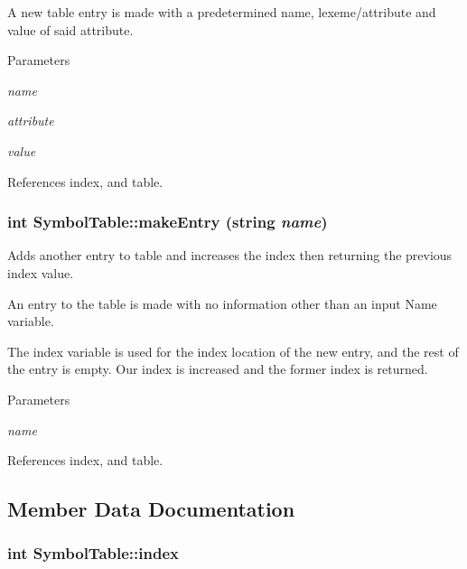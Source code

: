 A new table entry is made with a predetermined name, lexeme/attribute and value of said attribute. 


\begin{DoxyParams}{Parameters}
\item[{\em name}]\item[{\em attribute}]\item[{\em value}]\end{DoxyParams}


References index, and table.

\hypertarget{classSymbolTable_a1df7dfc3592c924e8c8a9fea1e13bf89}{
\subsubsection[{makeEntry}]{\setlength{\rightskip}{0pt plus 5cm}int SymbolTable::makeEntry (string {\em name})}}
\label{classSymbolTable_a1df7dfc3592c924e8c8a9fea1e13bf89}


Adds another entry to table and increases the index then returning the previous index value. 

An entry to the table is made with no information other than an input Name variable.

The index variable is used for the index location of the new entry, and the rest of the entry is empty. Our index is increased and the former index is returned. 
\begin{DoxyParams}{Parameters}
\item[{\em name}]\end{DoxyParams}


References index, and table.



\subsection{Member Data Documentation}
\hypertarget{classSymbolTable_a6e85689256b178941b87f51e570a6c1e}{
\subsubsection[{index}]{\setlength{\rightskip}{0pt plus 5cm}int {\bf SymbolTable::index}}}
\label{classSymbolTable_a6e85689256b178941b87f51e570a6c1e}


